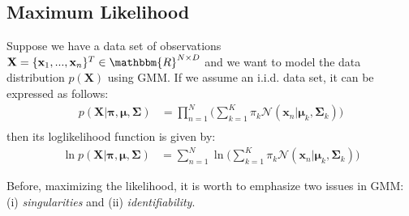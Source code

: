 \subsection{Maximum Likelihood}
Suppose we have a data set of observations $\mathbf{X}=\{\mathbf{x}_1,...,\mathbf{x}_n\}^{T}\in\mathbbm{R}^{N\times D}$ and we want to model the data distribution $p(\mathbf{X})$ using GMM. If we assume an \textrm{i.i.d.} data set, it can be expressed as follows: 
\begin{align*}
p(\mathbf{X}|\boldsymbol{\pi},\boldsymbol{\mu},\boldsymbol{\Sigma}) &=\prod_{n=1}^{N}\Bigg(\sum_{k=1}^{K}\pi_k\mathcal{N}(\mathbf{x}_n|\boldsymbol{\mu}_k, \boldsymbol{\Sigma}_k)\Bigg)\\
\end{align*}
then its loglikelihood function is given by:
\begin{align*}
\ln p(\mathbf{X}|\boldsymbol{\pi},\boldsymbol{\mu},\boldsymbol{\Sigma}) &= \sum_{n=1}^{N}\ln \Bigg(\sum_{k=1}^{K}\pi_k\mathcal{N}(\mathbf{x}_n|\boldsymbol{\mu}_k, \boldsymbol{\Sigma}_k)\Bigg)
\end{align*}


Before, maximizing the likelihood, it is worth to emphasize two issues in GMM: (i) \textit{singularities} and (ii) \textit{identifiability}.

